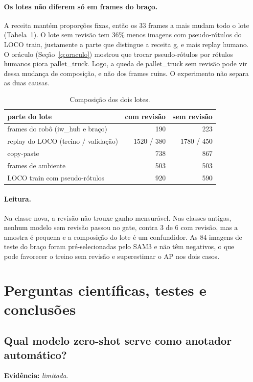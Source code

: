 \documentclass[11pt,a4paper]{article}
\newcommand{\evidencia}[1]{\noindent\textbf{Evidência:} \emph{#1}.\par}
\begin{document}
\paragraph{Os lotes não diferem só em frames do braço.} A receita mantém
proporções fixas, então os 33 frames a mais mudam todo o lote
(Tabela~\ref{tab:lotes}). O lote sem revisão tem 36\% menos imagens com
pseudo-rótulos do LOCO train, justamente a parte que distingue a receita g, e
mais replay humano. O oráculo (Seção~\ref{q:oraculo}) mostrou que trocar
pseudo-rótulos por rótulos humanos piora pallet\_truck. Logo, a queda de
pallet\_truck sem revisão pode vir dessa mudança de composição, e não dos frames
ruins. O experimento não separa as duas causas.

\begin{table}[H]
\centering\small
\caption{Composição dos dois lotes.}
\label{tab:lotes}
\begin{tabular}{lrr}
\toprule
parte do lote & com revisão & sem revisão \\
\midrule
frames do robô (iw\_hub e braço) & 190 & 223 \\
replay do LOCO (treino / validação) & 1520 / 380 & 1780 / 450 \\
copy-paste & 738 & 867 \\
frames de ambiente & 503 & 503 \\
LOCO train com pseudo-rótulos & 920 & 590 \\
\bottomrule
\end{tabular}
\end{table}

\paragraph{Leitura.} Na classe nova, a revisão não trouxe ganho mensurável.
Nas classes antigas, nenhum modelo sem revisão passou no gate, contra 3 de 6 com
revisão, mas a amostra é pequena e a composição do lote é um confundidor. As 84
imagens de teste do braço foram pré-selecionadas pelo SAM3 e não têm negativos,
o que pode favorecer o treino sem revisão e superestimar o AP nos dois casos.

\section{Perguntas científicas, testes e conclusões}
\label{sec:perguntas}

\subsection{Qual modelo zero-shot serve como anotador automático?}
\evidencia{limitada}
\end{document}
